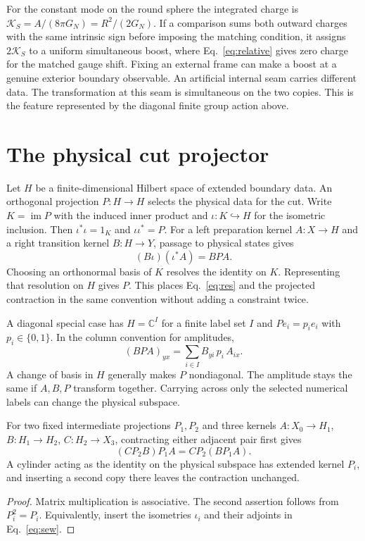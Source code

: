 \documentclass[11pt,letterpaper]{article}
\newcommand{\CC}{\mathbb C}
\newcommand{\im}{\operatorname{im}}
\begin{document}
For the constant mode on the round sphere the integrated charge is
\(\mathcal K_S=A/(8\pi G_N)=R^2/(2G_N)\). If a comparison sums both
outward charges with the same intrinsic sign before imposing the matching
condition, it assigns \(2\mathcal K_S\) to a uniform simultaneous boost,
where Eq.~\eqref{eq:relative} gives zero charge for the matched gauge
shift. Fixing an external frame can make a boost at a genuine exterior
boundary observable. An artificial internal seam carries different data.
The transformation at this seam is simultaneous on the two copies. This
is the feature represented by the diagonal finite group action above.

\section{The physical cut projector}
\label{sec:projector}
Let \(H\) be a finite-dimensional Hilbert space of extended boundary data.
An orthogonal projection \(P:H\to H\) selects the physical data for the cut.
Write \(K=\im P\) with the induced inner product and
\(\iota:K\hookrightarrow H\) for the isometric inclusion. Then
\(\iota^*\iota=1_K\) and \(\iota\iota^*=P\).
For a left preparation kernel \(A:X\to H\) and a right transition kernel
\(B:H\to Y\), passage to physical states gives
\begin{equation}
 (B\iota)(\iota^*A)=BPA .
 \label{eq:sew}
\end{equation}
Choosing an orthonormal basis of \(K\) resolves the identity on \(K\).
Representing that resolution on \(H\) gives \(P\).
This places Eq.~\eqref{eq:res} and the projected contraction in the
same convention without adding a constraint twice.

A diagonal special case has \(H=\CC^I\) for a finite label set \(I\) and
\(P e_i=p_i e_i\) with \(p_i\in\{0,1\}\). In the column convention for
amplitudes,
\[
 (BPA)_{yx}=\sum_{i\in I} B_{yi}\,p_i\,A_{ix}.
\]
A change of basis in \(H\) generally makes \(P\) nondiagonal. The amplitude
stays the same if \(A,B,P\) transform together. Carrying across only the
selected numerical labels can change the physical subspace.

\begin{lemma}
For two fixed intermediate projections \(P_1,P_2\) and three kernels
\(A:X_0\to H_1\), \(B:H_1\to H_2\), \(C:H_2\to X_3\),
contracting either adjacent pair first gives
\[
 (C P_2 B)P_1 A=C P_2(BP_1 A).
\]
A cylinder acting as the identity on the physical subspace has extended
kernel \(P_i\), and inserting a second copy there leaves the contraction
unchanged.
\end{lemma}
\begin{proof}
Matrix multiplication is associative. The second assertion follows from
\(P_i^2=P_i\). Equivalently, insert the isometries \(\iota_i\) and their
adjoints in Eq.~\eqref{eq:sew}.
\end{proof}
\end{document}
